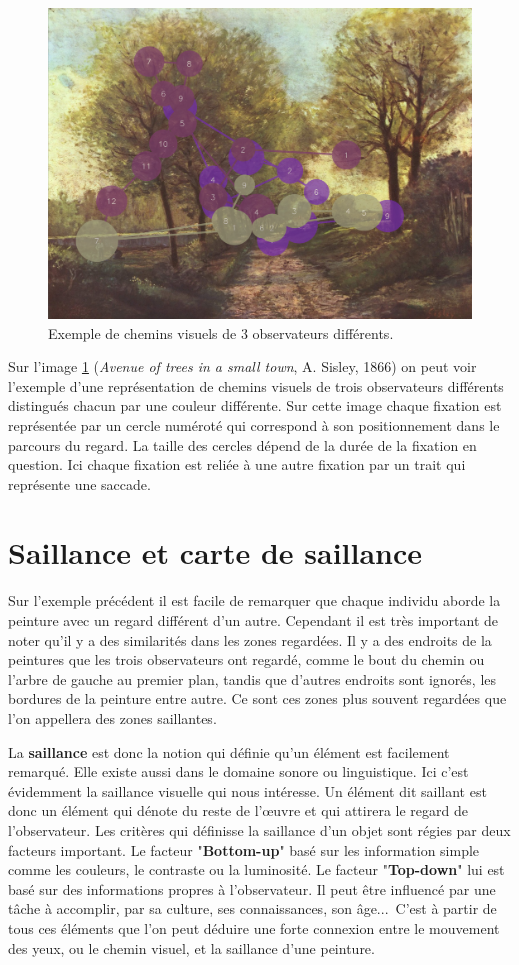 \begin{figure}[!ht]
    \centering
    \includegraphics[width=0.7\linewidth]{datas/exemple_scanpaths2.png}
    \caption{Exemple de chemins visuels de 3 observateurs différents.}
    \label{ex_scanpath}
\end{figure}

\par
Sur l'image \ref{ex_scanpath} (\emph{Avenue of trees in a small town}, A. Sisley, 1866) on peut voir l'exemple d'une représentation de chemins visuels de trois observateurs différents distingués chacun par une couleur différente. Sur cette image chaque fixation est représentée par un cercle numéroté qui correspond à son positionnement dans le parcours du regard. La taille des cercles dépend de la durée de la fixation en question. Ici chaque fixation est reliée à une autre fixation par un trait qui représente une saccade.

\section{Saillance et carte de saillance}
\par
Sur l'exemple précédent il est facile de remarquer que chaque individu aborde la peinture avec un regard différent d'un autre. Cependant il est très important de noter qu'il y a des similarités dans les zones regardées. Il y a des endroits de la peintures que les trois observateurs ont regardé, comme le bout du chemin ou l'arbre de gauche au premier plan, tandis que d'autres endroits sont ignorés, les bordures de la peinture entre autre. Ce sont ces zones plus souvent regardées que l'on appellera des zones saillantes.

\par
La \textbf{saillance} est donc la notion qui définie qu'un élément est facilement remarqué. Elle existe aussi dans le domaine sonore ou linguistique. Ici c'est évidemment la saillance visuelle qui nous intéresse. Un élément dit saillant est donc un élément qui dénote du reste de l'\oe{}uvre et qui attirera le regard de l'observateur. Les critères qui définisse la saillance d'un objet sont régies par deux facteurs important. Le facteur "\textbf{Bottom-up}" basé sur les information simple comme les couleurs, le contraste ou la luminosité. Le facteur "\textbf{Top-down}" lui est basé sur des informations propres à l'observateur. Il peut être influencé par une tâche à accomplir, par sa culture, ses connaissances, son âge...\ C'est à partir de tous ces éléments que l'on peut déduire une forte connexion entre le mouvement des yeux, ou le chemin visuel, et la saillance d'une peinture.

